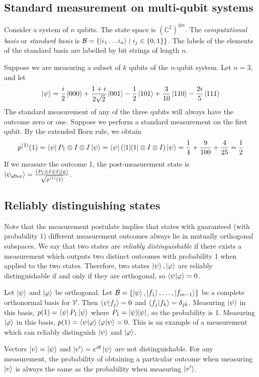 \subsection{Standard measurement on multi-qubit systems}
Consider a system of \( n \) qubits.
The state space is \( (\mathbb C^2)^{\otimes n} \).
The \emph{computational basis} or \emph{standard basis} is \( \mathcal B = \qty{\ket{i_1 \dots i_n} \mid i_j \in \qty{0,1}} \).
The labels of the elements of the standard basis are labelled by bit strings of length \( n \).

Suppose we are measuring a subset of \( k \) qubits of the \( n \)-qubit system.
Let \( n = 3 \), and let
\[ \ket{\psi} = \frac{i}{2} \ket{000} + \frac{1+i}{2\sqrt{2}} \ket{001} - \frac{1}{2} \ket{101} + \frac{3}{10} \ket{110} - \frac{2i}{5} \ket{111} \]
The standard measurement of any of the three qubits will always have the outcome zero or one.
Suppose we perform a standard measurement on the first qubit.
By the extended Born rule, we obtain
\[ p^{(1)}(1) = \bra{\psi} P_1 \otimes I \otimes I \ket{\psi} = \bra{\psi} \qty(\op{1}{1} \otimes I \otimes I) \ket{\psi} = \frac{1}{4} + \frac{9}{100} + \frac{4}{25} = \frac{1}{2} \]
If we measure the outcome 1, the post-measurement state is \( \ket{\psi_{\text{after}}} = \frac{(P_1 \otimes I \otimes I)\ket{\psi}}{\sqrt{p^{(1)}(1)}} \).

\subsection{Reliably distinguishing states}
Note that the measurement postulate implies that states with guaranteed (with probability 1) different measurement outcomes always lie in mutually orthogonal subspaces.
We say that two states are \emph{reliably distinguishable} if there exists a measurement which outputs two distinct outcomes with probability 1 when applied to the two states.
Therefore, two states \( \ket{\psi}, \ket{\varphi} \) are reliably distinguishable if and only if they are orthogonal, so \( \ip{\psi}{\varphi} = 0 \).

Let \( \ket{\psi} \) and \( \ket{\varphi} \) be orthogonal.
Let \( \mathcal B = \qty{\ket{\psi}, \ket{f_1}, \dots, \ket{f_{m-1}}} \) be a complete orthonormal basis for \( \mathcal V \).
Then \( \ip{\psi}{f_j} = 0 \) and \( \ip{f_j}{f_k} = \delta_{jk} \).
Measuring \( \ket{\psi} \) in this basis, \( p(1) = \bra{\psi} P_1 \ket{\psi} \) where \( P_1 = \op{\psi}{\psi} \), so the probability is 1.
Measuring \( \ket{\varphi} \) in this basis, \( p(1) = \ip{\psi}{\varphi} \ip{\varphi}{\psi} = 0 \).
This is an example of a measurement which can reliably distinguish \( \ket{\psi} \) and \( \ket{\varphi} \).

Vectors \( \ket{v} = \ket{\psi} \) and \( \ket{v'} = e^{i\theta} \ket{\psi} \) are not distinguishable.
For any measurement, the probability of obtaining a particular outcome when measuring \( \ket{v} \) is always the same as the probability when measuring \( \ket{v'} \).

